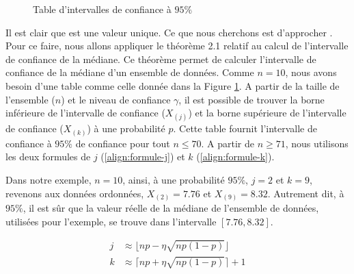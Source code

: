 \begin{figure}
	\captionsetup{justification=centering}
	
	\caption{Table d'intervalles de confiance à $95\%$ \cite{leboudec2010performance}}\label{fig:tableCI}
\end{figure} 
 Il est clair que {\textmu} est une valeur unique. Ce que nous cherchons est d'approcher {\textmu}. Pour ce faire, nous allons appliquer le théorème 2.1 relatif au calcul de l'intervalle de confiance de la médiane. Ce théorème permet de calculer l'intervalle de confiance de la médiane d'un ensemble de données. Comme $n = 10 $, nous avons besoin d'une table comme celle  donnée dans la Figure \ref{fig:tableCI}. A partir de la taille de l'ensemble ($n$) et le niveau de confiance $\gamma$, il est possible de trouver la borne inférieure de l'intervalle de confiance ($X_{(j)}$) et la borne supérieure de l'intervalle de confiance ($X_{(k)}$) à une probabilité $p$. Cette table fournit l'intervalle de confiance à $95 \%$ de confiance pour tout $n \leq 70$. A partir de $n \geq 71$, nous utilisons les deux formules de $ j $ (\ref{align:formule-j}) et $ k $ (\ref{align:formule-k}).
 
Dans notre exemple,  $n = 10$, ainsi, à une probabilité $95\%$, $j = 2$ et $ k = 9$, revenons aux données ordonnées,  $ X_{(2)} = 7.76 $ et  $ X_{(9)} =8.32 $. Autrement dit, à $95\%$, il est sûr que la valeur réelle de la médiane de l'ensemble de données, utilisées pour l'exemple, se trouve dans l'intervalle $[7.76, 8.32]$.
 
\begin{align}
j&\approx \lfloor np - \eta  \sqrt{np(1-p)}\rfloor \label{align:formule-j}\\
k&\approx \lceil np + \eta  \sqrt{np(1-p)}\rceil + 1 \label{align:formule-k}
\end{align}

